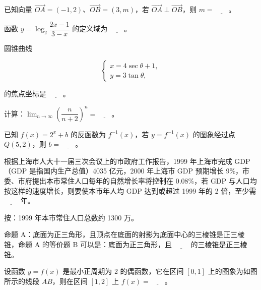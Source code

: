 \begin{question}
已知向量 $\overrightarrow{OA}=(-1,2)$、$\overrightarrow{OB}=(3,m)$，若 $\overrightarrow{OA}\perp\overrightarrow{OB}$，则 $m=\underline{\qquad}$。

\end{question}
\begin{question}
函数 $y=\log_{2}\dfrac{2x-1}{3-x}$ 的定义域为 $\underline{\qquad}$。

\end{question}
\begin{question}
圆锥曲线

\nopagebreak[4]
\[
\begin{cases}
x=4\sec\theta+1,\\
y=3\tan\theta,
\end{cases}
\]

的焦点坐标是 $\underline{\qquad}$。

\end{question}
\begin{question}
计算：$\displaystyle\lim_{n\to\infty}\left(\dfrac{n}{n+2}\right)^n=\underline{\qquad}$。

\end{question}
\begin{question}
已知 $f(x)=2^x+b$ 的反函数为 $f^{-1}(x)$，若 $y=f^{-1}(x)$ 的图象经过点 $Q(5,2)$，则 $b=\underline{\qquad}$。

\end{question}
\begin{question}
根据上海市人大十一届三次会议上的市政府工作报告，1999 年上海市完成 GDP（GDP 是指国内生产总值）4035 亿元，2000 年上海市 GDP 预期增长 9\%，市委、市府提出本市常住人口每年的自然增长率将控制在 0.08\%，若 GDP 与人口均按这样的速度增长，则要使本市年人均 GDP 达到或超过 1999 年的 2 倍，至少需 $\underline{\qquad}$ 年。

按：1999 年本市常住人口总数约 1300 万。

\end{question}
\begin{question}
命题 A：底面为正三角形，且顶点在底面的射影为底面中心的三棱锥是正三棱锥，命题 A 的等价题 B 可以是：底面为正三角形，且 $\underline{\qquad}$ 的三棱锥是正三棱锥。

\Needspace{0.4\textheight}
\end{question}
\begin{question}
设函数 $y=f(x)$ 是最小正周期为 2 的偶函数，它在区间 $[0,1]$ 上的图象为如图所示的线段 $AB$，则在区间 $[1,2]$ 上 $f(x)=\underline{\qquad}$。
\nopagebreak[4]
\begin{center}\end{center}
\nopagebreak[4]
\end{question}
